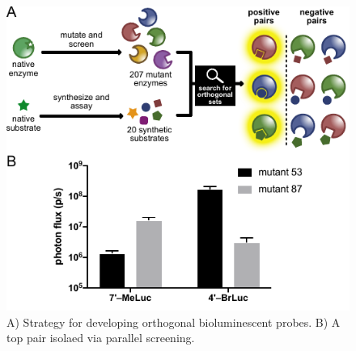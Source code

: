 \documentclass[11pt]{article}
\begin{document}
\begin{figure}
\vspace{-0.2in}
\begin{centering}
\includegraphics[width=\textwidth]{figures/algorithm_v5.pdf}

\end{centering}
\footnotesize
\caption{\label{figure:algorithm}
A) Strategy for developing orthogonal bioluminescent probes. B) A top pair isolaed via parallel screening.
}
\end{figure}
\end{document}
